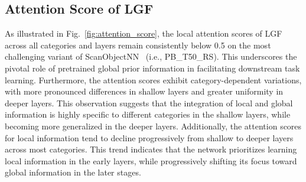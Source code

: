\subsection{Attention Score of LGF}  
As illustrated in Fig.~\ref{fig:attention_score}, the local attention scores of LGF across all categories and layers remain consistently below 0.5 on the most challenging variant of ScanObjectNN~\cite{uy2019revisiting} (i.e., PB\_T50\_RS). This underscores the pivotal role of pretrained global prior information in facilitating downstream task learning. Furthermore, the attention scores exhibit category-dependent variations, with more pronounced differences in shallow layers and greater uniformity in deeper layers. This observation suggests that the integration of local and global information is highly specific to different categories in the shallow layers, while becoming more generalized in the deeper layers. Additionally, the attention scores for local information tend to decline progressively from shallow to deeper layers across most categories. This trend indicates that the network prioritizes learning local information in the early layers, while progressively shifting its focus toward global information in the later stages.



